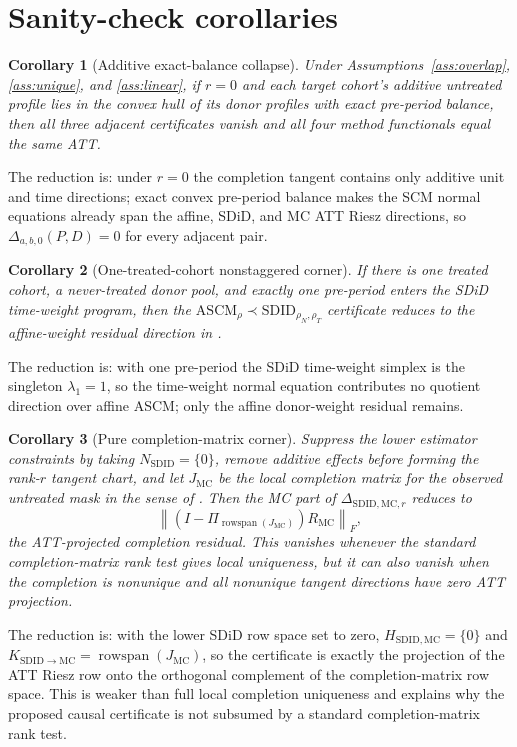 \documentclass[11pt]{article}
\theoremstyle{definition}
\theoremstyle{plain}
\newtheorem{corollary}{Corollary}
\theoremstyle{remark}
\begin{document}
\section{Sanity-check corollaries}
\begin{corollary}[Additive exact-balance collapse]\label{cor:additive}
Under Assumptions~\ref{ass:overlap}, \ref{ass:unique}, and
\ref{ass:linear}, if $r=0$ and each target cohort's additive untreated profile
lies in the convex hull of its donor profiles with exact pre-period balance,
then all three adjacent certificates vanish and all four method functionals
equal the same ATT.
\end{corollary}
The reduction is: under $r=0$ the completion tangent contains only additive
unit and time directions; exact convex pre-period balance makes the SCM
normal equations already span the affine, SDiD, and MC ATT Riesz directions,
so $\Delta_{a,b,0}(P,D)=0$ for every adjacent pair.

\begin{corollary}[One-treated-cohort nonstaggered corner]\label{cor:single}
If there is one treated cohort, a never-treated donor pool, and exactly one
pre-period enters the SDiD time-weight program, then the
$\mathrm{ASCM}_{\rho}\prec\mathrm{SDID}_{\rho_N,\rho_T}$ certificate reduces
to the affine-weight residual direction in \citet{DoudchenkoImbens2016}.
\end{corollary}
The reduction is: with one pre-period the SDiD time-weight simplex is the
singleton $\lambda_1=1$, so the time-weight normal equation contributes no
quotient direction over affine ASCM; only the affine donor-weight residual
remains.

\begin{corollary}[Pure completion-matrix corner]\label{cor:completion}
Suppress the lower estimator constraints by taking
$N_{\mathrm{SDID}}=\{0\}$, remove additive effects before forming the rank-$r$
tangent chart, and let $J_{\mathrm{MC}}$ be the local completion matrix for
the observed untreated mask in the sense of \citet{SingerCucuringu2010}. Then
the MC part of $\Delta_{\mathrm{SDID},\mathrm{MC},r}$ reduces to
\[
  \left\|(I-\Pi_{\operatorname{rowspan}(J_{\mathrm{MC}})})R_{\mathrm{MC}}\right\|_F,
\]
the ATT-projected completion residual. This vanishes whenever the standard
completion-matrix rank test gives local uniqueness, but it can also vanish
when the completion is nonunique and all nonunique tangent directions have
zero ATT projection.
\end{corollary}
The reduction is: with the lower SDiD row space set to zero,
$H_{\mathrm{SDID},\mathrm{MC}}=\{0\}$ and
$K_{\mathrm{SDID}\to\mathrm{MC}}=\operatorname{rowspan}(J_{\mathrm{MC}})$,
so the certificate is exactly the projection of the ATT Riesz row onto the
orthogonal complement of the completion-matrix row space. This is weaker than
full local completion uniqueness and explains why the proposed causal
certificate is not subsumed by a standard completion-matrix rank test.
\end{document}
